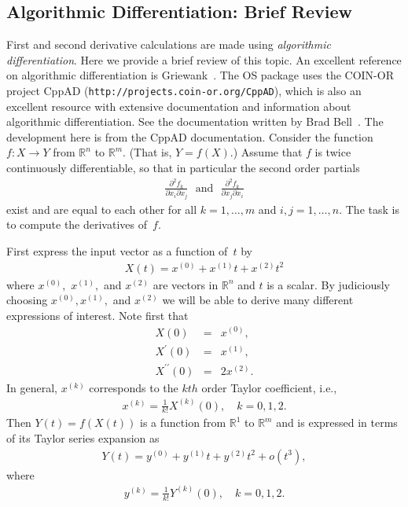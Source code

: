 \documentclass[11pt]{article}
\newcommand{\DD}[3]{ \frac{\partial^2 #1}{\partial #2 \partial #3} }
\renewcommand{\_}{{\char"5F}}
\renewcommand{\{}{{\char"7B}}
\renewcommand{\}}{{\char"7D}}
\renewcommand{\^}{{\char"0D}}
\renewcommand{\'}{{\char"0D}}
\newcommand{\UrlCppad}{http://projects.coin-or.org/CppAD}
\begin{document}
\begin{enumerate}[Step 1:]
\subsection{Algorithmic Differentiation:  Brief Review}\label{section:adtheory}

First and second derivative calculations are made using 
{\it algorithmic differentiation}.
Here we provide a brief review of this topic.  An excellent reference on algorithmic differentiation
is Griewank~\cite{griewank2000}.  The OS package uses the COIN-OR project 
CppAD ({\tt\UrlCppad}), which  is also an excellent resource with extensive  
documentation and information about algorithmic differentiation.
See the documentation written by  Brad Bell~\cite{bell2007}.    
The development here is from the CppAD documentation.  
Consider the function $f:X \rightarrow Y$ from $ \mathbb{R}^{n}$ to $ \mathbb{R}^{m}$.
(That is, $Y = f(X).$) Assume that $f$ is twice continuously differentiable, so that in particular the second order 
partials
\begin{eqnarray}
\DD{f_{k}}{x_{i}}{x_{j}}\ \ \  \mbox{and}\ \ \     \DD{f_{k}}{x_{j}}{x_{i}} \label{eq:mixedPartials}
\end{eqnarray}
exist and are equal to each other for all $k=1,\ldots,m$ and $i,j=1,\ldots,n$. The task is to compute the derivatives 
of~$f$.
 
First express the input vector as a function of~$t$ by
\begin{eqnarray}
X(t) = x^{(0)} +  x^{(1)} t +  x^{(2)} t^{2}
\end{eqnarray}
where $ x^{(0)},$ $x^{(1)},$ and $x^{(2)}$ are vectors in $ \mathbb{R}^{n}$  and $t$ is a scalar.  By judiciously choosing $x^{(0)}, x^{(1)},$ and $x^{(2)}$ we will be able to derive many different expressions of interest.  Note first that
\begin{eqnarray*}
X(0) &=& x^{(0)}, \\
X^{\prime}(0) &=& x^{(1)}, \\
X^{\prime \prime }(0) &=& 2 x^{(2)}.
\end{eqnarray*}
In general,  $x^{(k)}$ corresponds to the $kth$ order Taylor coefficient, i.e.,
\begin{eqnarray}
x^{(k)} = \frac{1}{k!}X^{(k)}(0), \quad k = 0, 1, 2.  \label{eq:xTaylorCoeff}
\end{eqnarray}
Then $Y(t) = f(X(t))$ is a function from $ \mathbb{R}^{1}$ to $ \mathbb{R}^{m}$ and is expressed in terms of its Taylor series expansion as
\begin{eqnarray}
Y(t)  = y^{(0)} +  y^{(1)} t +  y^{(2)} t^{2} + o(t^{3}),
\end{eqnarray}
where
\begin{eqnarray}
y^{(k)} = \frac{1}{k!} Y^{(k)}(0), \quad k = 0, 1, 2.  \label{eq:yTaylorCoeff}
\end{eqnarray}




\end{enumerate}
\end{document}
